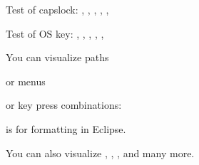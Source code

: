 \documentclass{article}
\begin{document}
Test of capslock: \keys{\capslock}, \keys{\capslockwin}, \keys{\capslockmac}, \capslock, \capslockwin, \capslockmac

\strut

Test of OS key: \keys{\OS}, \keys{\OSwin}, \keys{\OSmac}, \OS, \OSwin, \OSmac

    You can visualize paths


    or menus


    or key press combinations:

     is for formatting
    in Eclipse.

    You can also visualize \keys{\tab}, \keys{\capslock}, \keys{\Space}, 
    \keys{\arrowkeyup} and many more.
    
\end{document}
